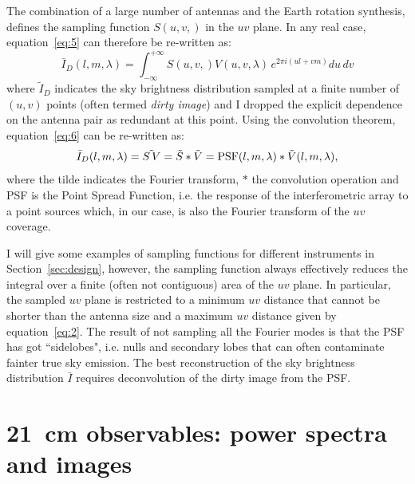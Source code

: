 The combination of a large number of antennas and the Earth rotation synthesis, defines the sampling function $S(u,v,)$ in the $uv$ plane. In any real case, equation~\ref{eq:5} can therefore be re-written as:
\begin{equation}
{\bar I}_D (l, m, \lambda) = \int_{- \infty}^{+ \infty} S(u,v,) V (u,v, \lambda) \, e^{2 \pi i (ul + vm)} du \, dv
\label{eq:6}
\end{equation}
where ${\tilde I}_D$ indicates the sky brightness distribution sampled at a finite number of $(u,v)$ points (often termed {\it dirty image}) and I dropped the explicit dependence on the antenna pair as redundant at this point. Using the convolution theorem, equation~\ref{eq:6} can be re-written as:
\begin{equation}
{\bar I}_D (l, m, \lambda)  =  \tilde{S \, V} =  {\tilde S} \ast {\tilde V} = {\rm PSF} (l, m, \lambda) \ast {\tilde V} (l, m, \lambda),
\label{eq:6}
\end{equation}
where the tilde indicates the Fourier transform, $\ast$ the convolution operation and {\rm PSF} is the Point Spread Function, i.e. the response of the interferometric array to a point sources which, in our case, is also the Fourier transform of the $uv$ coverage.

I will give some examples of sampling functions for different instruments in Section~\ref{sec:design}, however, the sampling function always effectively reduces the integral over a finite (often not contiguous) area of the $uv$ plane. In particular, the sampled $uv$ plane is restricted to a minimum $uv$ distance that cannot be shorter than the antenna size and a maximum $uv$ distance given by equation~\ref{eq:2}. The result of not sampling all the Fourier modes is that the PSF has got ``sidelobes", i.e. nulls and secondary lobes that can often contaminate fainter true sky emission. The best reconstruction of the sky brightness distribution ${\bar I}$ requires deconvolution of the dirty image from the PSF. 




\section{21~cm observables: power spectra and images}
\label{sec:observables}

